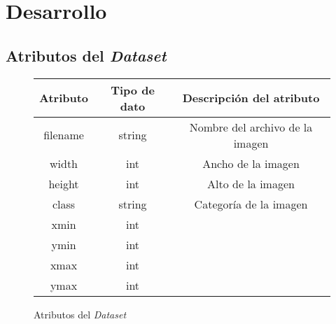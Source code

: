 \section{Desarrollo}

\subsection{Atributos del \textit{Dataset}}

\begin{figure}[ht]
    \centering
    \begin{tabular}{|c|c|c|}
        \hline
        \textbf{Atributo} & \textbf{Tipo de dato} & \textbf{Descripción del atributo}\\ \hline
        filename & string & Nombre del archivo de la imagen \\ \hline
        width & int & Ancho de la imagen \\ \hline
        height & int & Alto de la imagen \\ \hline
        class & string & Categoría de la imagen \\ \hline
        xmin & int & \\ \hline
        ymin & int & \\ \hline
        xmax & int & \\ \hline
        ymax & int & \\ \hline
    \end{tabular}
    \caption{Atributos del \textit{Dataset}}
\end{figure}
